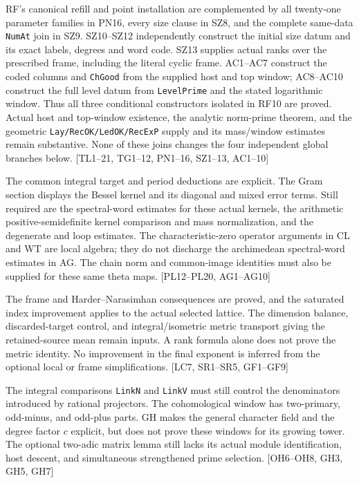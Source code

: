 \documentclass[11pt,a4paper]{article}
\numberwithin{equation}{section}
\theoremstyle{remark}\newtheorem{remark}[theorem]{Remark}
\begin{document}
\begin{description}[style=nextline]
RF's canonical refill and point installation are complemented by all
twenty-one parameter families in PN16, every size clause in SZ8, and
the complete same-data \texttt{NumAt} join in SZ9. SZ10--SZ12
independently construct the initial size datum and its exact labels,
degrees and word code. SZ13 supplies actual ranks over the prescribed
frame, including the literal cyclic frame. AC1--AC7 construct the coded
columns and \texttt{ChGood} from the supplied host and top window;
AC8--AC10 construct the full level datum from \texttt{LevelPrime}
and the stated logarithmic window. Thus all three conditional
constructors isolated in RF10 are proved. Actual host and top-window
existence, the analytic norm-prime theorem, and the geometric
\texttt{Lay/RecOK/LedOK/RecExP} supply and its mass/window estimates
remain substantive. None of these joins changes the four independent
global branches below.
\textsf{[TL1--21, TG1--12, PN1--16, SZ1--13, AC1--10]}


\item[Theta identities, spectral estimates, and arithmetic kernel normalization.]
The common integral target and period deductions are explicit. The Gram section displays the Bessel kernel and its diagonal and mixed error terms. Still required are the spectral-word estimates for these actual kernels, the arithmetic positive-semidefinite kernel comparison and mass normalization, and the degenerate and loop estimates. The characteristic-zero operator arguments in CL and WT are local algebra; they do not discharge the archimedean spectral-word estimates in AG. The chain norm and common-image identities must also be supplied for these same theta maps. \textsf{[PL12--PL20, AG1--AG10]}

\item[Actual dimensions, metrics, and discarded target directions.]
The frame and Harder--Narasimhan consequences are proved, and the saturated index improvement applies to the actual selected lattice. The dimension balance, discarded-target control, and integral/isometric metric transport giving the retained-source mean remain inputs. A rank formula alone does not prove the metric identity. No improvement in the final exponent is inferred from the optional local or frame simplifications. \textsf{[LC7, SR1--SR5, GF1--GF9]}

\item[Congruence denominators and cohomological windows.]
The integral comparisons \texttt{LinkN} and \texttt{LinkV} must still control the denominators introduced by rational projectors. The cohomological window has two-primary, odd-minus, and odd-plus parts. GH makes the general character field and the degree factor $c$ explicit, but does not prove these windows for its growing tower. The optional two-adic matrix lemma still lacks its actual module identification, host descent, and simultaneous strengthened prime selection. \textsf{[OH6--OH8, GH3, GH5, GH7]}


\end{description}
\end{document}
